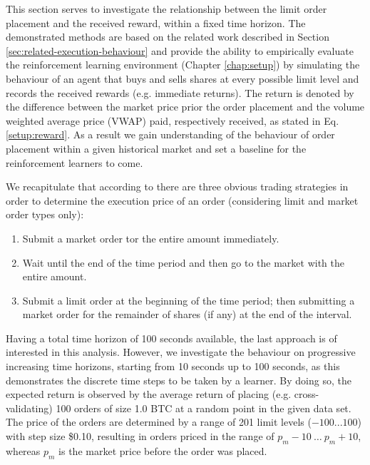 This section serves to investigate the relationship between the limit order placement and the received reward, within a fixed time horizon.
The demonstrated methods are based on the related work described in Section \ref{sec:related-execution-behaviour} and provide the ability to empirically evaluate the reinforcement learning environment (Chapter \ref{chap:setup}) by simulating the behaviour of an agent that buys and sells shares at every possible limit level and records the received rewards (e.g. immediate returns).
The return is denoted by the difference between the market price prior the order placement and the volume weighted average price (VWAP) paid, respectively received, as stated in Eq. \ref{setup:reward}.
As a result we gain understanding of the behaviour of order placement within a given historical market and set a baseline for the reinforcement learners to come.

We recapitulate that according to \cite{nevmyvaka2005electronic, yingsaeree2012algorithmic} there are three obvious trading strategies in order to determine the execution price of an order (considering limit and market order types only):
\begin{enumerate}
    \item Submit a market order tor the entire amount immediately.
    \item Wait until the end of the time period and then go to the market with the entire amount.
    \item Submit a limit order at the beginning of the time period; then submitting a market order for the remainder of shares (if any) at the end of the interval.
\end{enumerate}
Having a total time horizon of 100 seconds available, the last approach is of interested in this analysis.
However, we investigate the behaviour on progressive increasing time horizons, starting from 10 seconds up to 100 seconds, as this demonstrates the discrete time steps to be taken by a learner.
By doing so, the expected return is observed by the average return of placing (e.g. cross-validating) 100 orders of size 1.0 BTC at a random point in the given data set.
The price of the orders are determined by a range of 201 limit levels ($-100...100$) with step size \$0.10, resulting in orders priced in the range of $p_m-10 \ \dots \ p_m+10$, whereas $p_m$ is the market price before the order was placed.

